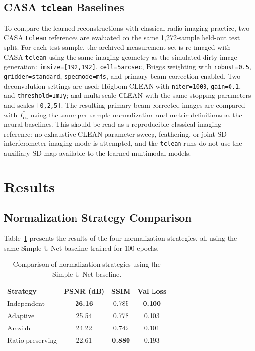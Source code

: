 \documentclass[twocolumn]{aastex631}
\begin{document}
\subsection{CASA \texttt{tclean} Baselines}

To compare the learned reconstructions with classical radio-imaging practice, two CASA \texttt{tclean} references are evaluated on the same 1,272-sample held-out test split.
For each test sample, the archived measurement set is re-imaged with CASA \texttt{tclean} using the same imaging geometry as the simulated dirty-image generation: \texttt{imsize=[192,192]}, \texttt{cell=5arcsec}, Briggs weighting with \texttt{robust=0.5}, \texttt{gridder=standard}, \texttt{specmode=mfs}, and primary-beam correction enabled.
Two deconvolution settings are used: H{\"o}gbom CLEAN with \texttt{niter=1000}, \texttt{gain=0.1}, and \texttt{threshold=1mJy}; and multi-scale CLEAN with the same stopping parameters and scales \texttt{[0,2,5]}.
The resulting primary-beam-corrected images are compared with $I_{\mathrm{ref}}^*$ using the same per-sample normalization and metric definitions as the neural baselines.
This should be read as a reproducible classical-imaging reference: no exhaustive CLEAN parameter sweep, feathering, or joint SD--interferometer imaging mode is attempted, and the \texttt{tclean} runs do not use the auxiliary SD map available to the learned multimodal models.

\section{Results}
\label{sec:results}

\subsection{Normalization Strategy Comparison}

Table~\ref{tab:normalization} presents the results of the four normalization strategies, all using the same Simple U-Net baseline trained for 100 epochs.

\begin{table}[t]
	\centering
	\caption{Comparison of normalization strategies using the Simple U-Net baseline.}
	\label{tab:normalization}
	\begin{tabular}{lccc}
		\toprule
		Strategy         & PSNR (dB)      & SSIM           & Val Loss       \\
		\midrule
		Independent      & \textbf{26.16} & 0.785          & \textbf{0.100} \\
		Adaptive         & 25.54          & 0.778          & 0.103          \\
		Arcsinh          & 24.22          & 0.742          & 0.101          \\
		Ratio-preserving & 22.61          & \textbf{0.880} & 0.193          \\
		\bottomrule
	\end{tabular}
\end{table}
\end{document}
